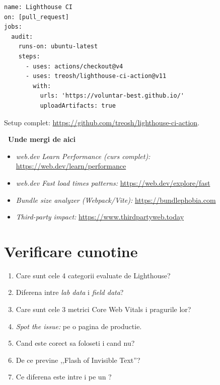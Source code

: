 \begin{bonusbox}
\begin{lstlisting}[caption={\texttt{.github/workflows/lighthouse.yml} minimal}, basicstyle=\ttfamily\small, backgroundcolor=\color{codeBg}, frame=leftline, framerule=2.5pt, rulecolor=\color{partcolor}, framexleftmargin=4pt, xleftmargin=14pt]
name: Lighthouse CI
on: [pull_request]
jobs:
  audit:
    runs-on: ubuntu-latest
    steps:
      - uses: actions/checkout@v4
      - uses: treosh/lighthouse-ci-action@v11
        with:
          urls: 'https://voluntar-best.github.io/'
          uploadArtifacts: true
\end{lstlisting}

Setup complet: \url{https://github.com/treosh/lighthouse-ci-action}.

\medskip

\textbf{\faRoute\ Unde mergi de aici}

\begin{itemize}[itemsep=1pt]
  \item \emph{web.dev Learn Performance (curs complet):} \url{https://web.dev/learn/performance}
  \item \emph{web.dev Fast load times patterns:} \url{https://web.dev/explore/fast}
  \item \emph{Bundle size analyzer (Webpack/Vite):} \url{https://bundlephobia.com}
  \item \emph{Third-party impact:} \url{https://www.thirdpartyweb.today}
\end{itemize}
\end{bonusbox}

\section*{Verificare cunotine}

\begin{selfcheck}
\begin{enumerate}[itemsep=2pt]
  \item Care sunt cele 4 categorii evaluate de Lighthouse?
  \item Diferena intre \emph{lab data} i \emph{field data}?
  \item Care sunt cele 3 metrici Core Web Vitals i pragurile lor?
  \item \emph{Spot the issue:}  pe o pagina de productie.
  \item Cand este corect sa foloseti  i cand nu?
  \item De ce  previne ,,Flash of Invisible Text''?
  \item Ce diferena este intre  i  pe un ?
\end{enumerate}
\end{selfcheck}

